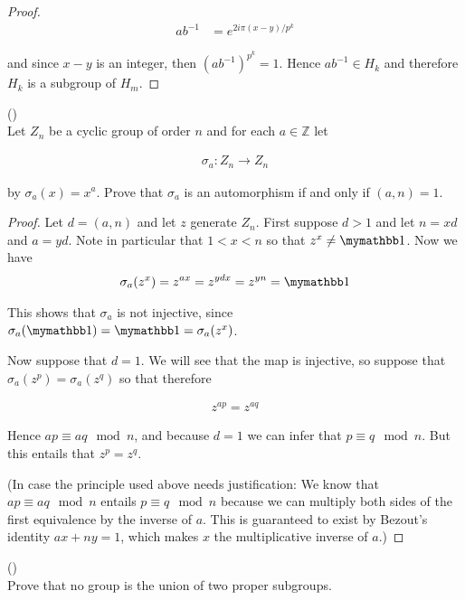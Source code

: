 \documentclass{exam}
\begin{document}
\begin{questions}
\begin{proof}
  \begin{align*}
    ab^{-1} &= e^{2i\pi(x-y)/p^k}
  \end{align*}

  and since $x-y$ is an integer, then $(ab^{-1})^{p^k}=1$.  Hence $ab^{-1}\in H_k$ and therefore $H_k$ is a subgroup of $H_m$.
\end{proof}

\vspace{1cm}

\question() \\
Let $Z_n$ be a cyclic group of order $n$ and for each $a\in\mathbb Z$ let

\begin{align*}
  \sigma_a: Z_n\rightarrow Z_n
\end{align*}

by $\sigma_a(x)=x^a$.  Prove that $\sigma_a$ is an automorphism if and only if $(a,n)=1$.

\begin{proof}
  Let $d=(a,n)$ and let $z$ generate $Z_n$.  First suppose $d>1$ and let $n=xd$ and $a=yd$.  Note in particular that $1<x<n$ so that $z^x\ne \mymathbb 1$. Now we have
  \begin{align*}
    \sigma_a(z^x)=z^{ax}=z^{ydx}=z^{yn}=\mymathbb 1
  \end{align*}

  This shows that $\sigma_a$ is not injective, since $\sigma_a(\mymathbb 1)=\mymathbb 1=\sigma_a(z^x)$.

  Now suppose that $d=1$.  We will see that the map is injective, so suppose that $\sigma_a(z^p)=\sigma_a(z^q)$ so that therefore

  \begin{align*}
    z^{ap}=z^{aq}
  \end{align*}

  Hence $ap\equiv aq\mod n$, and because $d=1$ we can infer that $p\equiv q\mod n$.  But this entails that $z^p=z^q$.

  (In case the principle used above needs justification:  We know that $ap\equiv aq \mod n$ entails $p\equiv q\mod n$ because we can multiply both sides of the first equivalence by the inverse of $a$. This is guaranteed to exist by Bezout's identity $ax+ny=1$, which makes $x$ the multiplicative inverse of $a$.)

\end{proof}

\question()\\
Prove that no group is the union of two proper subgroups.


\end{questions}
\end{document}
